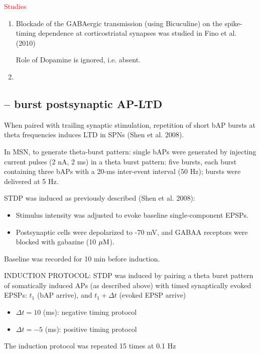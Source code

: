 \textcolor{red}{Studies}
\begin{enumerate}
  \item Blockade of the GABAergic transmission (using Bicuculine) on the
  spike-timing dependence at corticostriatal synapses was studied in Fino et al. (2010)

Role of Dopamine is ignored, i.e. absent. 


  \item 

\end{enumerate}

\subsection{-- burst postsynaptic AP-LTD}

 When paired with trailing synaptic stimulation, repetition of short bAP
bursts at theta frequencies induces LTD in SPNs (Shen et al. 2008).

\begin{mdframed}

In MSN, to generate theta-burst pattern: single bAPs were generated by injecting
current pulses (2 nA, 2 ms) in a theta burst pattern: five bursts, each burst
containing three bAPs with a 20-ms inter-event interval (50 Hz); bursts were
delivered at 5 Hz.

STDP was induced as previously described (Shen et al. 2008): 
\begin{itemize}
  \item Stimulus intensity was adjusted to evoke
baseline single-component EPSPs.
  
  \item Postsynaptic cells were depolarized
to -70 mV, and GABAA receptors were blocked with gabazine
(10 ${\mu\text{M}}$).
   
\end{itemize}
Baseline was recorded for 10 min before induction.

INDUCTION PROTOCOL: STDP was induced by pairing a theta burst pattern of
somatically induced APs (as described above) with timed synaptically evoked
EPSPs: $t_1$ (bAP arrive), and $t_1 + \Delta t$ (evoked EPSP arrive)
\begin{itemize}
  \item $\Delta t = 10$ (ms): negative timing protocol
  
  \item $\Delta t = -5$ (ms): positive timing protocol 
\end{itemize}
The induction protocol was repeated 15 times at 0.1 Hz
\end{mdframed}

